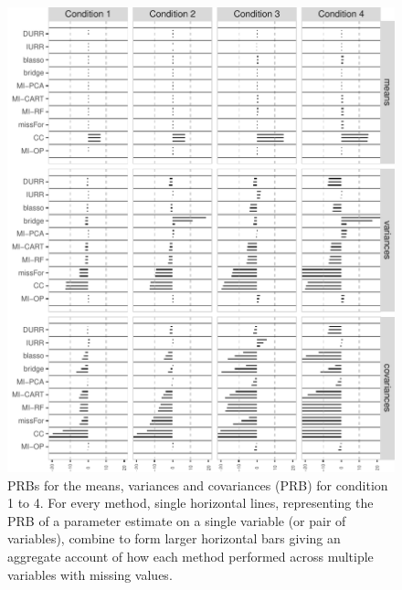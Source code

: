 \begin{figure}
	\includegraphics{../../output/graphs/exp2_semR_bias_14_summy.pdf}
\caption{PRBs for the means, variances and covariances (PRB) for condition 1 to 4.
	For every method, single horizontal lines, representing the PRB of a parameter estimate on 
	a single variable (or pair of variables), combine to form larger horizontal bars giving an 
	aggregate account of how each method performed across multiple variables with missing values.
}
\label{fig:exp2bias14}
\end{figure}

